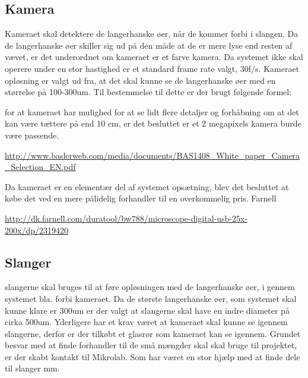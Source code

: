 \subsection{Kamera}
Kameraet skal detektere de langerhanske øer, når de kommer forbi i slangen.  Da de langerhanske øer skiller sig ud på den måde at de er mere lyse end resten af vævet, er det underordnet om kameraet er et farve kamera. Da systemet ikke skal operere under en stor hastighed er et standard frame rate valgt, 30f/s. Kameraet opløsning er valgt ud fra, at det skal kunne se de langerhanske øer med en størrelse på 100-300um. Til bestemmelse til dette er der brugt følgende formel:
 
for at kameraet har mulighed for at se lidt flere detaljer og forhåbning om at det kan være tættere på end 10 cm, er det besluttet er et 2 megapixels kamera burde være passende.

\url{http://www.baslerweb.com/media/documents/BAS1408_White_paper_Camera_Selection_EN.pdf}


Da kameraet er en elementær del af systemet opsætning, blev det besluttet at købe det ved en mere pålidelig forhandler til en overkommelig pris. Farnell


\url{http://dk.farnell.com/duratool/bw788/microscope-digital-usb-25x-200x/dp/2319420}
 
 \subsection{Slanger}
slangerne skal bruges til at føre opløsningen med de langerhanske øer, i gennem systemet bla. forbi kameraet. Da de største langerhanske øer, som systemet skal kunne klare er 300um er der valgt at slangerne skal have en indre diameter på cirka 500um. Yderligere har et krav været at kameraet skal kunne se igennem slangerne, derfor er der tilkøbt et glasrør som kameraet kan se igennem. Grundet besvar med at finde forhandler til de små mængder skal skal bruge til projektet, er der skabt kontakt til Mikrolab. Som har været en stor hjælp med at finde dele til slanger mm.

